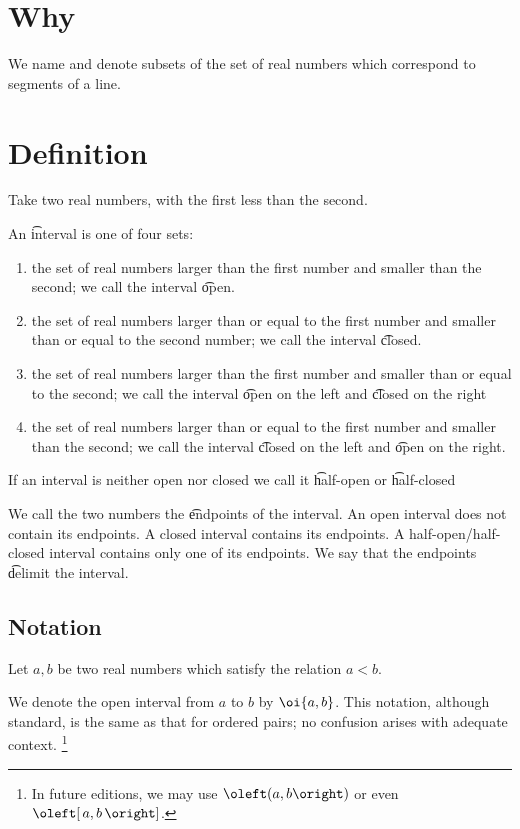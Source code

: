 
\section*{Why}

We name and denote subsets of the set of real numbers which correspond to segments of a line.

\section*{Definition}

Take two real numbers, with the first less than the second.

An \t{interval} is one of four sets:
  \begin{enumerate}
  \item the set of real numbers larger than the first number and smaller than the second; we call the interval \t{open}.
  \item the set of real numbers larger than or equal to the first number and smaller than or equal to the second number; we call the interval \t{closed}.
  \item the set of real numbers larger than the first number and smaller than or equal to the second; we call the interval \t{open on the left} and \t{closed on the right}
  \item the set of real numbers larger than or equal to the first number and smaller than the second; we call the interval \t{closed on the left} and \t{open on the right}.
  \end{enumerate}
If an interval is neither open nor closed we call it \t{half-open} or \t{half-closed}

We call the two numbers the \t{endpoints} of the interval.
An open interval does not contain its endpoints.
A closed interval contains its endpoints.
A half-open/half-closed interval contains only one of its endpoints.
We say that the endpoints \t{delimit} the interval.

\subsection*{Notation}

Let $a, b$ be two real numbers which satisfy the relation $a < b$.

We denote the open interval from $a$ to $b$ by $\oi{a, b}$.
This notation, although standard, is the same as that for ordered pairs; no confusion arises with adequate context.
  \ifhmode\unskip\fi\footnote{
In future editions, we may use $\oleft(a, b\oright)$ or even $\oleft[\,a, b\,\oright]$.
  }

